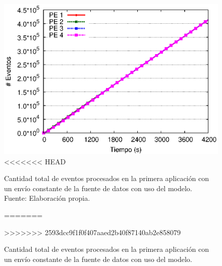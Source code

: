 \begin{figure}[!ht]
	\centering
	\captionsetup{justification=centering}
    \includegraphics[scale=0.7]{images/exp/app1/uniform/cm/eventCount.eps}
<<<<<<< HEAD
    \caption[Cantidad total de eventos procesados en la primera aplicación con un envío constante de la fuente de datos con uso del modelo.]{Cantidad total de eventos procesados en la primera aplicación con un envío constante de la fuente de datos con uso del modelo.\\Fuente: Elaboración propia.}
=======
    \caption{Cantidad total de eventos procesados en la primera aplicaci\'on con un env\'io constante de la fuente de datos con uso del modelo.}
>>>>>>> 2593dcc9f1f0f407aaed2b40f87140ab2e858079
    \label{fig:app1-uniform-eventCount-cm}
\end{figure}


